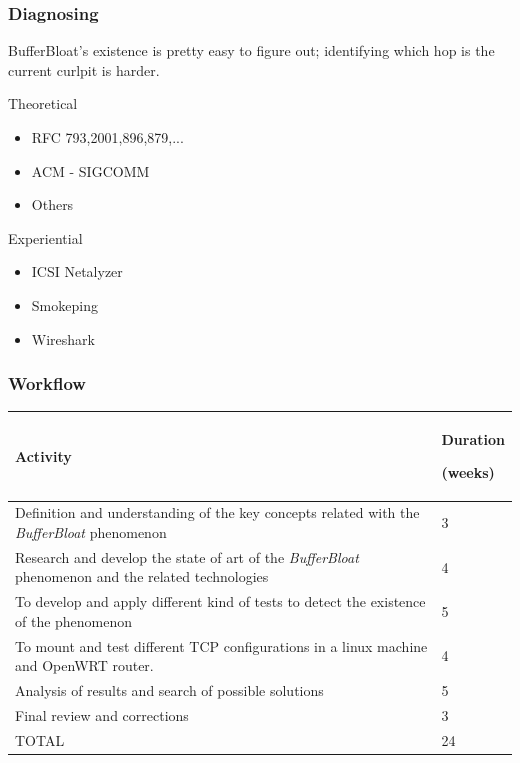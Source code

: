 \documentclass{beamer}
\begin{document}
\begin{frame}
\frametitle{Diagnosing}
\begin{block}{}
BufferBloat's existence is pretty easy to figure out; identifying which hop is the current curlpit is harder.
\end{block}
\begin{block}{Theoretical}
\begin{center}
\begin{itemize}
\item RFC 793,2001,896,879,...
\item ACM - SIGCOMM
\item Others
\end{itemize}
\end{center}
\end{block}
\begin{block}{Experiential}
\begin{center}
\begin{itemize}
\item ICSI Netalyzer
\item Smokeping
\item Wireshark
\end{itemize}
\end{center}
\end{block}
\end{frame}
%
\begin{frame}
\frametitle{Workflow}
\begin{center}\begin{tabular}{|p{9cm}|p{2cm}|}
\hline
Activity & \centerline{Duration}\centerline{(weeks)}\\
\hline
	Definition and understanding of the key concepts related with the \textit{BufferBloat} phenomenon & \centerline{3}\\
\hline
	Research and develop the state of art of the \textit{BufferBloat} phenomenon and the related technologies & \centerline{4} \\
\hline
	To develop and apply different kind of tests to detect the existence of the phenomenon & \centerline{5}\\
\hline
 To mount and test different TCP configurations in a linux machine and OpenWRT router.& \centerline{4}\\
\hline
	Analysis of results and search of possible solutions & \centerline{5}\\
\hline
Final review and corrections & \centerline{3}\\
\hline
TOTAL & \centerline{24}\\
\hline
\end{tabular}\end{center}

\end{frame}
\end{document}

